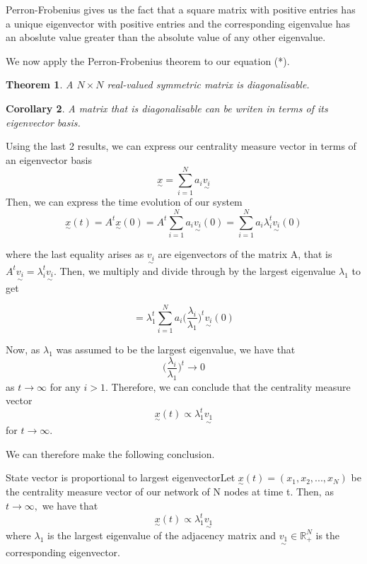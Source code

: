 \documentclass[twoside]{article}
\newcounter{lecnum}
\newcommand{\utilde}{\underset{\sim}}
\newtheorem{theorem}{Theorem}[lecnum]
\newtheorem{corollary}[theorem]{Corollary}
\begin{document}
Perron-Frobenius gives us the fact that a square matrix with positive entries has a unique eigenvector with positive entries and the corresponding eigenvalue has an aboslute value greater than the absolute value of any other eigenvalue.

We now apply the Perron-Frobenius theorem to our equation (*). 

\begin{theorem} A $N \times N$ real-valued symmetric matrix is diagonalisable.
\end{theorem}

\begin{corollary} A matrix that is diagonalisable can be writen in terms of its eigenvector basis.
\end{corollary}

Using the last 2 results, we can express our centrality measure vector in terms of an eigenvector basis
$$
\utilde{x} = \sum_{i=1}^{N}a_i\utilde{v_i}
$$
Then, we can express the time evolution of our system 
$$
\utilde{x}(t) = A^t\utilde{x}(0) = A^t\sum_{i=1}^{N}a_i\utilde{v_i}(0) = \sum_{i=1}^{N}a_i\lambda_i^t \utilde{v_i}(0)
$$

where the last equality arises as $\utilde{v_i}$ are eigenvectors of the matrix A, that is $A^t\utilde{v_i} = \lambda_i^t\utilde{v_i}$. Then, we multiply and divide through by the largest eigenvalue $\lambda_1$ to get

$$
= \lambda_1^t\sum_{i=1}^{N}a_i\bigg(\frac{\lambda_i}{\lambda_1}\bigg)^t \utilde{v_i}(0)
$$

Now, as $\lambda_1$ was assumed to be the largest eigenvalue, we have that 
$$
\bigg(\frac{\lambda_i}{\lambda_1}\bigg)^t \rightarrow 0
$$
as $t \rightarrow \infty$ for any $i > 1.$ Therefore, we can conclude that the centrality measure vector 
$$
\utilde{x}(t) \propto \lambda_1^t\utilde{v_1}
$$
for $t \rightarrow \infty.$

We can therefore make the following conclusion.

\begin{proposition_exam}{State vector is proportional to largest eigenvector}{}Let $\utilde{x}(t) = (x_1, x_2, ..., x_N)$ be the centrality measure vector of our network of N nodes at time t. Then, as $t \rightarrow \infty,$ we have that 
$$
\utilde{x}(t) \propto \lambda_1^t\utilde{v_1}
$$
where $\lambda_1$ is the largest eigenvalue of the adjacency matrix and $\utilde{v_1} \in \mathbb{R}_{+}^{N}$ is the corresponding eigenvector.
\end{proposition_exam}
\end{document}
